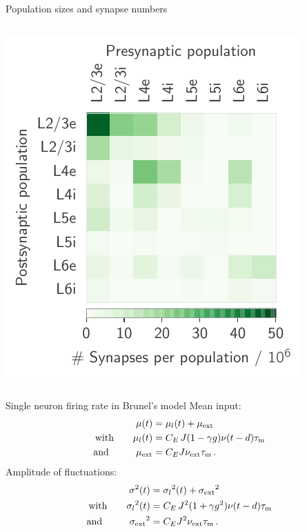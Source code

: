 \documentclass[xcolor=x11names,compress]{beamer}
\renewcommand{\(}{\begin{columns}}
\renewcommand{\)}{\end{columns}}
\newcommand{\<}[1]{\begin{column}{#1}}
\renewcommand{\>}{\end{column}}
\begin{document}
\begin{frame}[t]{Population sizes and synapse numbers}
\begin{columns}[T]
\begin{column}[T]{5cm}
        \includegraphics[width=1.1\linewidth]{../figures/synapse_numbers}
    \end{column}
    \end{columns}
\end{frame}
    

\begin{frame}[t]{Single neuron firing rate in Brunel's model}
    Mean input:
\begin{equation*}
    \begin{split}
        \mu(t)          &= \mu_l(t) + \mu_\text{ext} \\
        \text{with} \qquad \mu_l(t)        &= C_E \, J (1 - \gamma g) \nu(t - d) \tau_\text{m} \\
        \text{and~~\,} \qquad \mu_\text{ext}  &= C_E J \nu_\text{ext} \tau_\text{m} \,.
    \end{split}
\end{equation*}
\vfill
    Amplitude of fluctuations:
\begin{equation*}
    \begin{split}
        \sigma^2(t)     &= {\sigma_l}^2(t) + {\sigma_\text{ext}}^2 \\
        \text{with} \qquad      {\sigma_l}^2(t)       
                        &= C_E \, J^2 (1 + \gamma g^2) \nu(t - d) \tau_\text{m} \\
            \text{and~~\,}  \qquad    
        {\sigma_\text{ext}}^2  &= C_E J^2 \nu_\text{ext} \tau_\text{m} \,.
    \end{split}
\end{equation*}
\end{frame}
\end{document}
